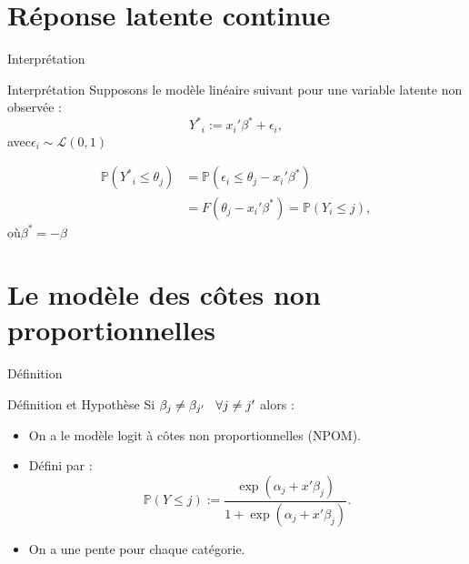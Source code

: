 \documentclass[11pt]{beamer}
\begin{document}
	
	\section{Réponse latente continue}
	\begin{frame}{Interprétation}
		\begin{block}{Interprétation}
			Supposons le modèle linéaire suivant pour une variable latente non observée : \[{Y^*}_i := x_i' \beta^* + \epsilon_i,\]\hspace{3mm}avec\hspace{3mm}$\epsilon_i \sim\mathcal{L}(0, 1)$
		\end{block}				
		
		
		\begin{block}{}
			\begin{align*}	
				\mathbb{P}({Y^*}_i \le \theta_j) &= \mathbb{P}(\epsilon_i \le \theta_j - x_i' \beta^*) \\
				&= F(\theta_j - x_i'\beta^*) = \mathbb{P}(Y_i \leq j) ,
			\end{align*}
			\hspace{3mm}où\hspace{3mm}$\beta^* = -\beta$	 							
		\end{block}		
		
	\end{frame}
	
	\section{Le modèle des côtes non proportionnelles}
	\begin{frame}{Définition}
		\begin{block}{Définition et Hypothèse}
			Si $\beta_j \neq \beta_{j'} \hspace{3mm}\forall j \neq j'$ alors :
			\begin{itemize}
				\item On a le modèle logit à côtes non proportionnelles (NPOM).
				\item Défini par : \[\mathbb{P}(Y \leq j) := \frac{\exp(\alpha_j + x' \beta_j)}{1 + \exp(\alpha_j + x' \beta_j)}.\]
				\item On a une pente pour chaque catégorie.
			\end{itemize}
			
		\end{block}
	\end{frame}	
	
\end{document}
